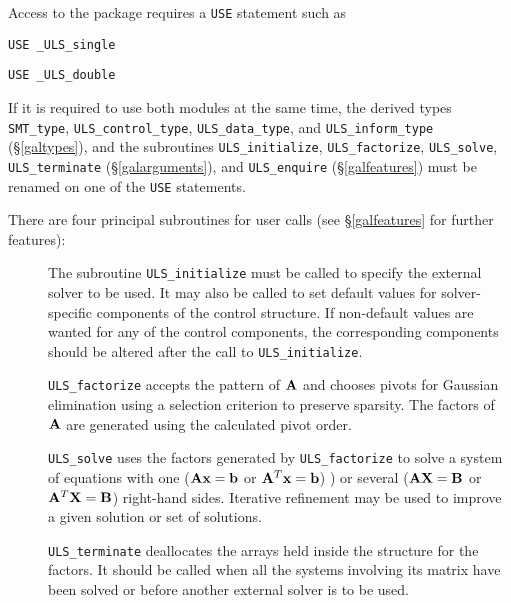 \documentclass{galahad}
\newcommand{\packagename}{ULS}
\newcommand{\fullpackagename}{\libraryname\_\-\packagename}
\begin{document}
Access to the package requires a {\tt USE} statement such as

\medskip{}

\hskip0.5in {\tt USE \fullpackagename\_single}

\medskip{}

\hskip0.5in {\tt USE  \fullpackagename\_double}

\medskip

If it is required to use both modules at the same time, the derived types
{\tt SMT\_type},
{\tt \packagename\_control\_type},
{\tt \packagename\_data\-\_type}, and
{\tt \packagename\_inform\_type}
(\S\ref{galtypes}),
and the subroutines
{\tt \packagename\_initialize},
{\tt \packagename\_factorize},
{\tt \packagename\_solve},
{\tt \packagename\_terminate}
(\S\ref{galarguments}),
and
{\tt \packagename\_enquire}
(\S\ref{galfeatures})
must be renamed on one of the {\tt USE} statements.

\noindent There are four principal subroutines for user calls (see
\S\ref{galfeatures} for further features):

\begin{description}

\item[] The subroutine {\tt \packagename\_initialize} must be called to
specify the external solver to be used.
It may also be called to set default values
for solver-specific components of the control structure.
If non-default values are
wanted for any of the control components, the corresponding components
should be altered after the call to {\tt \packagename\_initialize}.

\item[] {\tt \packagename\_factorize} accepts the pattern of ${\mathbf{A}}$
 and chooses pivots for Gaussian elimination using a selection
 criterion to preserve sparsity.  The factors of ${\mathbf{A}}$ are generated
 using the calculated pivot order.

\item[] {\tt \packagename\_solve} uses the factors generated by
  {\tt \packagename\_factorize} to
  solve a system of equations with one (${\mathbf{A}} {\mathbf{x}} = {\mathbf{b}}$ or ${\mathbf{A}}^T {\mathbf{x}} = {\mathbf{b}}$) )
  or several (${\mathbf{A}} {\mathbf{X}} = {\mathbf{B}}$ or ${\mathbf{A}}^T {\mathbf{X}} = {\mathbf{B}}$) right-hand sides.
  Iterative refinement may be used to improve a given solution
  or set of solutions.

\item[] {\tt \packagename\_terminate} deallocates the arrays held inside the
  structure for the factors. It should be called
  when all the systems involving its matrix have been solved
  or before another external solver is to be used.
\end{description}
\end{document}
